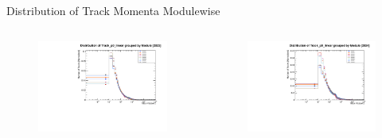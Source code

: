 \begin{frame}{Distribution of Track Momenta Modulewise}
    \begin{columns}
        \begin{column}{0.6\linewidth}
            \begin{figure}
                \centering
                \includegraphics[width=\linewidth]{./ModuleLevelPlots/Track_p0_linear_st0_2023.pdf}
            \end{figure}
        \end{column}
        \begin{column}{0.6\linewidth}
            \begin{figure}
                \centering
                \includegraphics[width=\linewidth]{./ModuleLevelPlots/Track_p0_linear_st0_2024.pdf}
            \end{figure}
        \end{column}
    \end{columns}


\end{frame}
